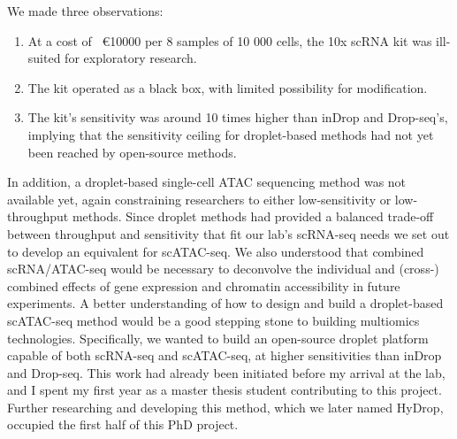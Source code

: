 We made three observations:
\begin{enumerate}[noitemsep]
	\item At a cost of ~\euro{\num{10000}} per 8 samples of 10 000 cells, the 10x scRNA kit was ill-suited for exploratory research.
	\item The kit operated as a black box, with limited possibility for modification.
	\item The kit's sensitivity was around 10 times higher than inDrop and Drop-seq's, implying that the sensitivity ceiling for droplet-based methods had not yet been reached by open-source methods.
\end{enumerate}

In addition, a droplet-based single-cell ATAC sequencing method was not available yet, again constraining researchers to either low-sensitivity or low-throughput methods. Since droplet methods had provided a balanced trade-off between throughput and sensitivity that fit our lab's scRNA-seq needs we set out to develop an equivalent for scATAC-seq. We also understood that combined scRNA/ATAC-seq would be necessary to deconvolve the individual and (cross-) combined effects of gene expression and chromatin accessibility in future experiments. A better understanding of how to design and build a droplet-based scATAC-seq method would be a good stepping stone to building multiomics technologies. Specifically, we wanted to build an open-source droplet platform capable of both scRNA-seq and scATAC-seq, at higher sensitivities than inDrop and Drop-seq. This work had already been initiated before my arrival at the lab, and I spent my first year as a master thesis student contributing to this project. Further researching and developing this method, which we later named HyDrop, occupied the first half of this PhD project.


